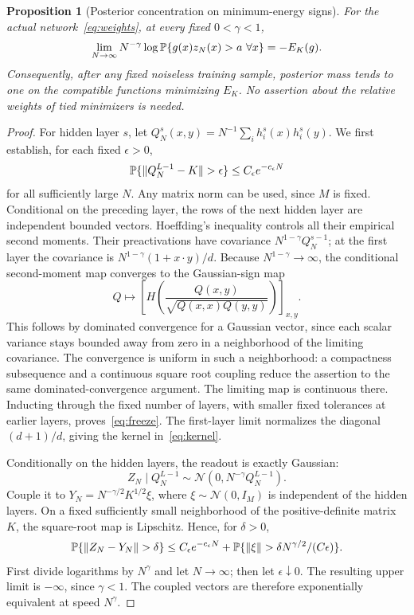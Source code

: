 \documentclass[11pt]{article}
\newtheorem{proposition}[theorem]{Proposition}
\theoremstyle{remark}\newtheorem{remark}[theorem]{Remark}
\begin{document}
\begin{proposition}[Posterior concentration on minimum-energy signs]
\label{prop:rate}
For the actual network~\eqref{eq:weights}, at every fixed
$0<\gamma<1$,
\begin{equation}\label{eq:rate}
 \lim_{N\to\infty}N^{-\gamma}\log
 \mathbb P\{g(x)z_N(x)>a\ \forall x\}=-E_K(g).
\end{equation}
Consequently, after any fixed noiseless training sample, posterior
mass tends to one on the compatible functions minimizing $E_K$.
No assertion about the relative weights of tied minimizers is needed.
\end{proposition}

\begin{proof}
For hidden layer $s$, let
$Q_N^s(x,y)=N^{-1}\sum_i h_i^s(x)h_i^s(y)$.
We first establish, for each fixed $\epsilon>0$,
\begin{equation}\label{eq:freeze}
 \Pp\{\|Q_N^{L-1}-K\|>\epsilon\}
       \le C_\epsilon e^{-c_\epsilon N}
\end{equation}
for all sufficiently large $N$. Any matrix norm can be used, since
$M$ is fixed. Conditional on the preceding layer, the rows of the
next hidden layer are independent bounded vectors. Hoeffding's
inequality controls all their empirical second moments. Their
preactivations have covariance $N^{1-\gamma}Q_N^{s-1}$; at the first
layer the covariance is
$N^{1-\gamma}(1+x\cdot y)/d$. Because $N^{1-\gamma}\to\infty$,
the conditional second-moment map converges to the Gaussian-sign map
\[
 Q\longmapsto \left[H\!\left(
 \frac{Q(x,y)}{\sqrt{Q(x,x)Q(y,y)}}\right)\right]_{x,y}.
\]
This follows by dominated convergence for a Gaussian vector, since
each scalar variance stays bounded away from zero in a neighborhood
of the limiting covariance. The convergence is uniform in such a
neighborhood: a compactness subsequence and a continuous square root
coupling reduce the assertion to the same dominated-convergence
argument. The limiting map is continuous there. Inducting through
the fixed number of layers, with smaller fixed tolerances at earlier
layers, proves~\eqref{eq:freeze}. The first-layer limit normalizes
the diagonal $(d+1)/d$, giving the kernel in~\eqref{eq:kernel}.

Conditionally on the hidden layers, the readout is exactly Gaussian:
\begin{equation}\label{eq:readout}
 Z_N\mid Q_N^{L-1}\sim\mathcal N(0,N^{-\gamma}Q_N^{L-1}).
\end{equation}
Couple it to $Y_N=N^{-\gamma/2}K^{1/2}\xi$, where
$\xi\sim\mathcal N(0,I_M)$ is independent of the hidden layers.
On a fixed sufficiently small neighborhood of the positive-definite
matrix $K$, the square-root map is Lipschitz. Hence, for $\delta>0$,
\[
 \Pp\{\|Z_N-Y_N\|>\delta\}
 \le C_\epsilon e^{-c_\epsilon N}
 +\Pp\{\|\xi\|>\delta N^{\gamma/2}/(C\epsilon)\}.
\]
First divide logarithms by $N^\gamma$ and let $N\to\infty$;
then let $\epsilon\downarrow0$. The resulting upper limit is
$-\infty$, since $\gamma<1$. The coupled vectors are therefore
exponentially equivalent at speed $N^\gamma$.


\end{proof}
\end{document}
